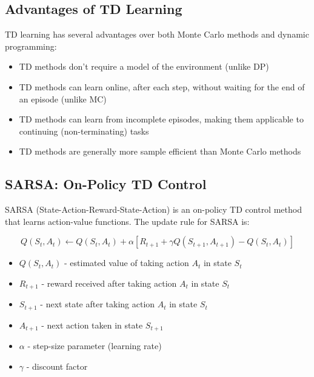 \documentclass[11pt,a4paper]{article}
\begin{document}
\subsection{Advantages of TD Learning}

TD learning has several advantages over both Monte Carlo methods and dynamic programming:

\begin{itemize}
    \item TD methods don't require a model of the environment (unlike DP)
    \item TD methods can learn online, after each step, without waiting for the end of an episode (unlike MC)
    \item TD methods can learn from incomplete episodes, making them applicable to continuing (non-terminating) tasks
    \item TD methods are generally more sample efficient than Monte Carlo methods
\end{itemize}

\subsection{SARSA: On-Policy TD Control}

SARSA (State-Action-Reward-State-Action) is an on-policy TD control method that learns action-value functions. The update rule for SARSA is:

\begin{equation}
Q(S_t, A_t) \leftarrow Q(S_t, A_t) + \alpha [R_{t+1} + \gamma Q(S_{t+1}, A_{t+1}) - Q(S_t, A_t)]
\end{equation}

\begin{tcolorbox}[title=Notation Overview]
\begin{itemize}
    \item $Q(S_t, A_t)$ - estimated value of taking action $A_t$ in state $S_t$
    \item $R_{t+1}$ - reward received after taking action $A_t$ in state $S_t$
    \item $S_{t+1}$ - next state after taking action $A_t$ in state $S_t$
    \item $A_{t+1}$ - next action taken in state $S_{t+1}$
    \item $\alpha$ - step-size parameter (learning rate)
    \item $\gamma$ - discount factor
\end{itemize}
\end{tcolorbox}
\end{document}
